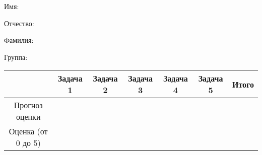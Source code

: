 \documentclass[pdftex,12pt,a4paper]{article}
\begin{document}
\begin{large}
Имя:
\end{large}

\vspace{4pt}

\begin{large}
Отчество:
\end{large}

\vspace{4pt}

\begin{large}
Фамилия:
\end{large}

\vspace{4pt}

\begin{large}
Группа:
\end{large}

\vspace{4pt} 

\begin{tabular}{|c|c|c|c|c|c|c|}
\hline  & Задача 1 & Задача 2 & Задача 3 & Задача 4 & Задача 5 & Итого \\ 
\hline Прогноз оценки &  &  &  &  &  & \\ 
\hline Оценка (от 0 до 5) &  &  &  &  &  & \\ 
\hline 
\end{tabular} 






\printindex %
\end{document}
